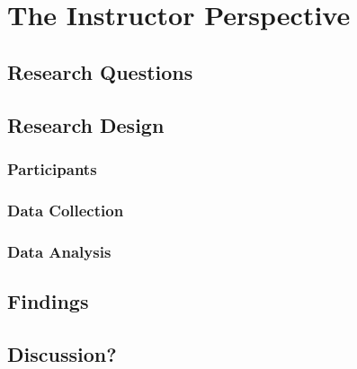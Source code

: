 \chapter{The Instructor Perspective}

\section{Research Questions}

\section{Research Design}

\subsection{Participants}

\subsection{Data Collection}

\subsection{Data Analysis}

\section{Findings}

\section{Discussion?}
